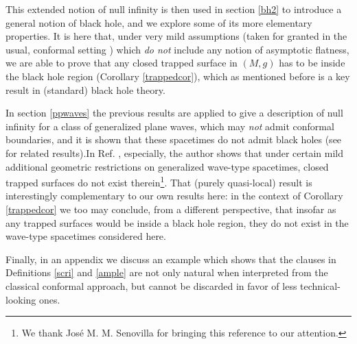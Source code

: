 This extended notion of null infinity is then used in section \ref{bh2} to introduce a general notion of black hole, and we explore some of its more elementary properties. It is here that, under very mild assumptions %
(taken for granted in the usual, conformal setting \cite{CostaFloresHerrera2018-2}) which {\em do not} include any notion of asymptotic flatness, we are able to prove that any closed trapped surface in $(M,g)$ has to be inside the black hole region (Corollary \ref{trappedcor}), which as mentioned before is a key result in (standard) black hole theory.

In section \ref{ppwaves} the previous results are applied to give a description of null infinity for a class of generalized plane waves, which may {\em not} admit conformal boundaries, and it is shown that these spacetimes do not admit black holes (see \cite{Florescausalboundarywavetype2008,HubenyRagamaniNoHorizons,SenovillaNoBHinPPWaves2003} for related results).In Ref. \cite{SenovillaNoBHinPPWaves2003}, especially, the author shows that under certain mild additional geometric restrictions on generalized wave-type spacetimes, closed trapped surfaces do not exist therein\footnote{We thank Jos\'{e} M. M. Senovilla for bringing this reference to our attention.}. That (purely quasi-local) result is interestingly complementary to our own results here: in the context of Corollary \ref{trappedcor} we too may conclude, from a different perspective, that insofar as any trapped surfaces would be inside a black hole region, they do not exist in the wave-type spacetimes considered here.

Finally, in an appendix we discuss an example which shows that the clauses in Definitions \ref{scri} and \ref{ample} are not only natural when interpreted from the classical conformal approach, but cannot be discarded in favor of less technical-looking ones. 



